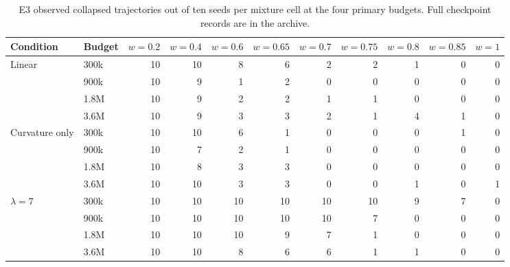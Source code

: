 \begin{table}[H]
\caption{E3 observed collapsed trajectories out of ten seeds per mixture cell at the four primary budgets. Full checkpoint records are in the archive.}
\label{tab:horizon_cells}
\centering\scriptsize
\begin{tabular}{@{}llrrrrrrrrr@{}}
\toprule
Condition & Budget & $w{=}0.2$ & $w{=}0.4$ & $w{=}0.6$ & $w{=}0.65$ & $w{=}0.7$ & $w{=}0.75$ & $w{=}0.8$ & $w{=}0.85$ & $w{=}1$ \\
\midrule
Linear & 300k & 10 & 10 & 8 & 6 & 2 & 2 & 1 & 0 & 0 \\
 & 900k & 10 & 9 & 1 & 2 & 0 & 0 & 0 & 0 & 0 \\
 & 1.8M & 10 & 9 & 2 & 2 & 1 & 1 & 0 & 0 & 0 \\
 & 3.6M & 10 & 9 & 3 & 3 & 2 & 1 & 4 & 1 & 0 \\
Curvature only & 300k & 10 & 10 & 6 & 1 & 0 & 0 & 0 & 1 & 0 \\
 & 900k & 10 & 7 & 2 & 1 & 0 & 0 & 0 & 0 & 0 \\
 & 1.8M & 10 & 8 & 3 & 3 & 0 & 0 & 0 & 0 & 0 \\
 & 3.6M & 10 & 10 & 3 & 3 & 0 & 0 & 1 & 0 & 1 \\
$\lambda=7$ & 300k & 10 & 10 & 10 & 10 & 10 & 10 & 9 & 7 & 0 \\
 & 900k & 10 & 10 & 10 & 10 & 10 & 7 & 0 & 0 & 0 \\
 & 1.8M & 10 & 10 & 10 & 9 & 7 & 1 & 0 & 0 & 0 \\
 & 3.6M & 10 & 10 & 8 & 6 & 6 & 1 & 1 & 0 & 0 \\
\bottomrule
\end{tabular}
\end{table}
